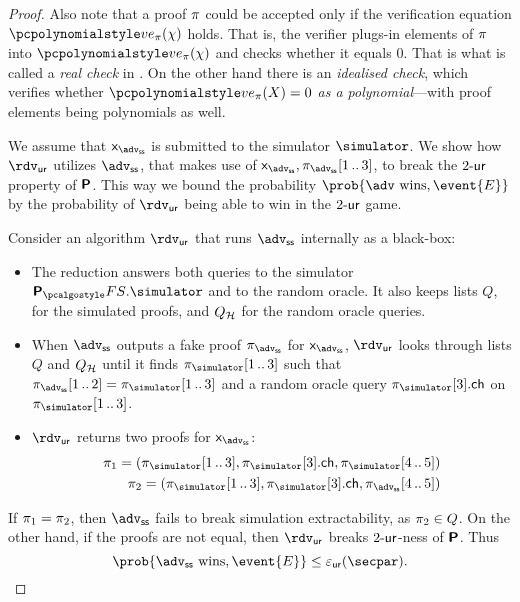 \documentclass[runningheads,11pt]{llncs}
\begin{document}
\begin{proof}
  Also note that a proof $\pi$ could be accepted only if the verification
  equation $\vereq_\zkproof(\chi)$ holds. That is, the verifier plugs-in elements of
  $\pi$ into $\vereq_\zkproof(\chi)$ and checks whether it equals $0$. That is what
  is called a \emph{real check} in \cite{EPRINT:GabWilCio19}.  On the other hand
  there is an \emph{idealised check}, which verifies whether $\vereq_\zkproof(X) = 0$
  \emph{as a polynomial}---with proof elements being polynomials as well.

   We assume that $\inp_{\advss}$ is submitted
  to the simulator $\simulator$.  We show how $\rdvur$ utilizes $\advss$, that
  makes use of $\inp_\advss, \zkproof_{\advss}\range{1}{3}$, to break the
  ${2\text{-}\mathsf{ur}}$ property of $\bm{\mathsf{P}}$.  This way we bound the probability
  $\prob{\adv \text{ wins}, \event{E}}$ by the probability of $\rdvur$ being
  able to win in the ${2\text{-}\mathsf{ur}}$ game.

  Consider an algorithm $\rdvur$ that runs $\advss$ internally as a black-box:
  \begin{itemize}
  \item The reduction answers both queries to the simulator
    $\plonkprotfs.\simulator$ and to the random oracle. It also keeps lists $Q$,
    for the simulated proofs, and $Q_{\mathcal{H}}$ for the random oracle queries.
  \item When $\advss$ outputs a fake proof $\zkproof_{\advss}$ for
    $\inp_\advss$, $\rdvur$ looks through lists $Q$ and $Q_{\mathcal{H}}$ until it finds
    $\zkproof_{\simulator}\range{1}{3}$ such that
    $\zkproof_{\advss}\range{1}{2} = \zkproof_{\simulator}\range{1}{3}$ and a
    random oracle query $\zkproof_{\simulator}[3].\ch$ on
    $\zkproof_{\simulator}\range{1}{3}$.
  \item $\rdvur$ returns two proofs for $\inp_\advss$:
    \begin{align*}
      \zkproof_1 = (\zkproof_{\simulator}\range{1}{3}, \zkproof_{\simulator}[3].\ch, \zkproof_{\simulator}\range{4}{5})\\
      \zkproof_2 = (\zkproof_{\simulator}\range{1}{3}, \zkproof_{\simulator}[3].\ch, \zkproof_{\advss}\range{4}{5})
    \end{align*}
  \end{itemize}
  If $\pi_1 = \pi_2$, then $\advss$ fails to break simulation
  extractability, as $\pi_2 \in Q$.  On the other hand, if the proofs are
  not equal, then $\rdvur$ breaks ${2\text{-}\mathsf{ur}}$-ness of $\bm{\mathsf{P}}$. Thus
  \[
    \prob{\advss \text{ wins}, \event{E}} \leq \epsur(\secpar).
  \]


\end{proof}
\end{document}
